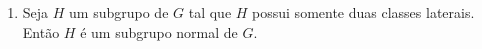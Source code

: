 \documentclass{beamer}
\begin{document}
    \begin{frame}
        \begin{exemplos}
            \begin{enumerate}[label=({\arabic*})]
                \seti

                \item Seja $H$ um subgrupo de $G$ tal que $H$ possui somente duas classes laterais. Então $H$ é um subgrupo normal de $G$.
                
                \conti
            \end{enumerate}
        \end{exemplos}
    \end{frame}
\end{document}
